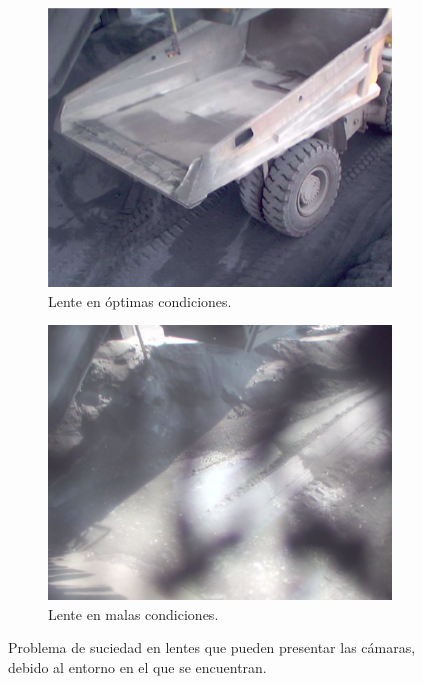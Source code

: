 \documentclass[
11pt, %
]{charter}
\begin{document}
\begin{figure}[htpb]
  \centering
  \begin{subfigure}[b]{0.48\textwidth}
    \includegraphics[width=\linewidth]{./Figuras/suciedad_a.png}
    \caption{Lente en óptimas condiciones.}
    \label{subfig:parte_a}
  \end{subfigure}
  \hfill
  \begin{subfigure}[b]{0.48\textwidth}
    \includegraphics[width=\linewidth]{./Figuras/suciedad_b.png}
    \caption{Lente en malas condiciones.}
    \label{subfig:parte_b}
  \end{subfigure}
  \caption{Problema de suciedad en lentes que pueden presentar las cámaras, debido al entorno en el que se encuentran.}
  \label{fig:ej_suciedad}
\end{figure}
\end{document}
